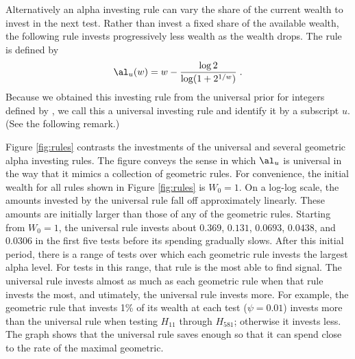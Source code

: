 \documentclass[12pt]{article}
\begin{document}
 Alternatively an alpha investing rule can vary the share of the current wealth
 to invest in the next test.  Rather than invest a fixed share of the available
 wealth, the following rule invests progressively less wealth as the wealth
 drops.  The rule is defined by
 \begin{equation}
   \al_u(w) = w - \frac{\log 2}{\log(1+2^{1/w})} \;.   
 \label{eq:Auniv}
 \end{equation}
 Because we obtained this investing rule from the universal prior for integers
 defined by \citet{rissanen83}, we call this a universal investing rule and
 identify it by a subscript $u$.  (See the following remark.)

 
 Figure \ref{fig:rules} contrasts the investments of the universal and
 several geometric alpha investing rules.  The figure conveys
 the sense in which $\al_u$ is universal in the way that it mimics a collection
 of geometric rules.  For convenience, the initial wealth for all rules shown in
 Figure \ref{fig:rules} is $W_0 = 1$.  On a log-log scale, the amounts invested
 by the universal rule fall off approximately linearly.  These amounts are
 initially larger than those of any of the geometric rules.  Starting from
 $W_0=1$, the universal rule invests about $0.369$, $0.131$, $0.0693$, $0.0438$,
 and $0.0306$ in the first five tests before its spending gradually slows.
  After this initial period, there is a range of tests over which each geometric rule invests the largest alpha level.  For tests in this range, that rule is the most able to find signal. The universal rule invests almost as much as each geometric rule when that rule invests the most, and utimately,  the universal rule invests more.  For example, the
 geometric rule that invests 1\% of its wealth at each test ($\psi=0.01$)
 invests more than the universal rule when testing $H_{11}$ through $H_{581}$;
 otherwise it invests less.  
 The graph shows that the universal rule saves enough so that it can spend
 close to the rate of the maximal geometric.  

\end{document}
